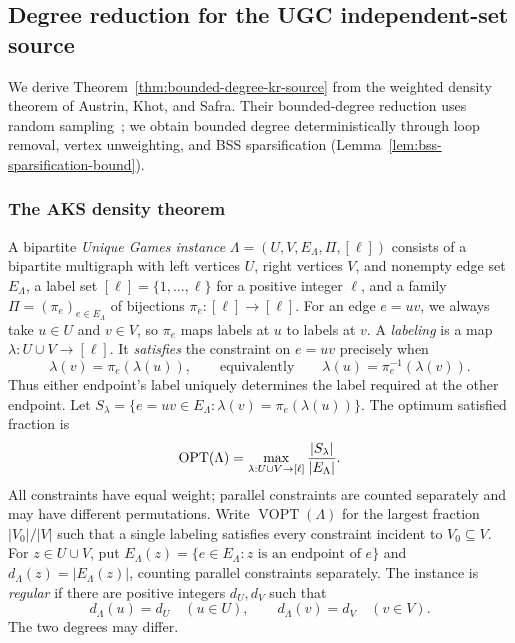 \subsection{Degree reduction for the UGC independent-set source}
\label{app:bounded-degree-ugc-source}

We derive Theorem~\ref{thm:bounded-degree-kr-source} from the weighted
density theorem of Austrin, Khot, and Safra. Their bounded-degree
reduction uses random sampling~\cite[Section~4, Steps~2--3]{AKS2011};
we obtain bounded degree deterministically through loop removal,
vertex unweighting, and BSS sparsification
(Lemma~\ref{lem:bss-sparsification-bound}).

\subsubsection{The AKS density theorem}

A bipartite \emph{Unique Games instance}
$\Lambda=(U,V,E_\Lambda,\Pi,[\ell])$ consists of a bipartite
multigraph with left vertices $U$, right vertices $V$, and nonempty
edge set $E_\Lambda$, a label set $[\ell]=\{1,\ldots,\ell\}$ for a
positive integer $\ell$, and a family
$\Pi=(\pi_e)_{e\in E_\Lambda}$ of bijections
$\pi_e:[\ell]\to[\ell]$. For an edge $e=uv$, we always take
$u\in U$ and $v\in V$, so $\pi_e$ maps labels at $u$ to labels at $v$.
A \emph{labeling} is a map $\lambda:U\cup V\to[\ell]$.
It \emph{satisfies} the constraint on $e=uv$ precisely when
\[
 \lambda(v)=\pi_e(\lambda(u)),
 \qquad\text{equivalently}\qquad
 \lambda(u)=\pi_e^{-1}(\lambda(v)).
\]
Thus either endpoint's label uniquely determines the label required
at the other endpoint. Let
$S_\lambda=\{e=uv\in E_\Lambda:\lambda(v)=\pi_e(\lambda(u))\}$.
The optimum satisfied fraction is
\[
 \operatorname{OPT}(\Lambda)=\max_{\lambda:U\cup V\to[\ell]}
 \frac{|S_\lambda|}{|E_\Lambda|}.
\]
All constraints have equal weight; parallel constraints are counted
separately and may have different permutations.
Write $\operatorname{VOPT}(\Lambda)$ for the largest fraction
$|V_0|/|V|$ such that a single labeling satisfies every constraint
incident to $V_0\subseteq V$.
For $z\in U\cup V$, put
$E_\Lambda(z)=\{e\in E_\Lambda:z\text{ is an endpoint of }e\}$ and
$d_\Lambda(z)=|E_\Lambda(z)|$, counting parallel constraints separately.
The instance is \emph{regular} if there are positive integers $d_U,d_V$
such that
\[
 d_\Lambda(u)=d_U\quad(u\in U),\qquad
 d_\Lambda(v)=d_V\quad(v\in V).
\]
The two degrees may differ.

